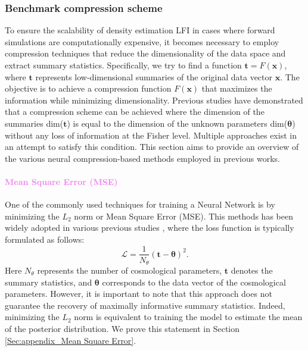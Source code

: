 \documentclass{aa}
\begin{document}
\subsubsection{Benchmark compression scheme}
To ensure the scalability of density estimation LFI in cases where forward simulations are computationally expensive, it becomes necessary to employ compression techniques that reduce the dimensionality of the data space and extract summary statistics. 
Specifically, we try to find a function $\bm{t}=F(\bm{x})$, where $\bm{t}$ represents low-dimensional summaries of the original data vector $\bm{x}$. The objective is to achieve a compression function $F(\bm{x})$ that maximizes the information while minimizing dimensionality. Previous studies \citep{heavens2000massive} have demonstrated that a compression scheme can be achieved where the dimension of the summaries dim($\bm{t}$) is equal to the dimension of the unknown parameters dim($\bm{\theta}$) without any loss of information at the Fisher level. Multiple approaches exist in an attempt to satisfy this condition. This section aims to provide an overview of the various neural compression-based methods employed in previous works.
\paragraph{\textcolor{violet}{Mean Square Error (MSE)}}
One of the commonly used techniques for training a Neural Network is by minimizing the $L_2$ norm or Mean Square Error (MSE).
This methods has been widely adopted in various previous studies  \citep{ribli2018improved, lu2022simultaneously, lu2023cosmological}, where the loss function is typically formulated as follows:
\begin{equation}
   \mathcal{L}=\frac{1}{N_{\theta}}(\bm{t}-\bm{\theta})^2.
\end{equation}
Here $N_{\theta}$ represents the number of cosmological parameters, $\bm{t}$ denotes the summary statistics, and $\bm{\theta}$ corresponds to the data vector of the cosmological parameters. 
However, it is important to note that this approach does not guarantee the recovery of maximally informative summary statistics. Indeed, minimizing the $L_{2}$ norm is equivalent to training the model to estimate the mean of the posterior distribution.  We prove this statement in Section \ref{Sec:appendix_Mean Square Error}.
\end{document}
